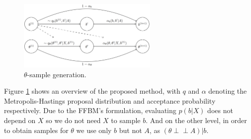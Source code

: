 \begin{figure}[!ht]
	\centering

%		
%		
%		
%		
	\includegraphics[width=0.6\textwidth]{img/sampling-sequence}
	\caption{$\theta$-sample generation.}
	\label{fig:samp-sequence}
\end{figure}
 
Figure \ref{fig:samp-sequence} shows an overview of the proposed method, with $q$ and $\alpha$ denoting the Metropolis-Hastings proposal distribution and acceptance probability respectively.
Due to the FFBM's formulation, evaluating $p(b| X)$ does not depend on $X$ so
we do not need $X$ to sample $b$.
And on the other level, in order to obtain 
samples for $\theta$
we use only $b$ but not $A$, as $(\theta \perp \!\!\! \perp A )| b$. 
